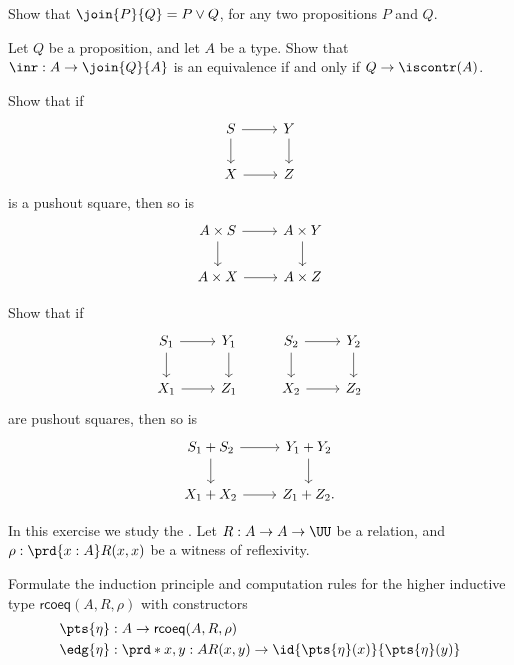\begin{exercises}
\item Show that $\join{P}{Q}= P\lor Q$, for any two propositions $P$ and $Q$.
\item Let $Q$ be a proposition, and let $A$ be a type. Show that $\inr:A\to \join{Q}{A}$ is an equivalence if and only if $Q\to\iscontr(A)$.
\item Show that if
\begin{equation*}
\begin{tikzcd}
S \arrow[r] \arrow[d] & Y \arrow[d] \\
X \arrow[r] & Z
\end{tikzcd}
\end{equation*}
is a pushout square, then so is
\begin{equation*}
\begin{tikzcd}
A\times S \arrow[r] \arrow[d] & A\times Y \arrow[d] \\
A\times X \arrow[r] & A\times Z
\end{tikzcd}
\end{equation*}
\item Show that if
\begin{equation*}
\begin{tikzcd}
S_1 \arrow[r] \arrow[d] & Y_1 \arrow[d] & S_2 \arrow[r] \arrow[d] & Y_2 \arrow[d] \\
X_1 \arrow[r] & Z_1 & X_2 \arrow[r] & Z_2
\end{tikzcd}
\end{equation*}
are pushout squares, then so is
\begin{equation*}
\begin{tikzcd}
S_1+S_2 \arrow[r] \arrow[d] & Y_1+ Y_2 \arrow[d] \\
X_1 +X_2 \arrow[r] & Z_1+Z_2. 
\end{tikzcd}
\end{equation*}
\item In this exercise we study the . Let $R:A\to A\to\UU$ be a relation, and $\rho:\prd{x:A}R(x,x)$ be a witness of reflexivity.  
\begin{subexenum}
\item Formulate the induction principle and computation rules for the higher inductive type $\mathsf{rcoeq}(A,R,\rho)$ with constructors
\begin{align*}
\pts{\eta} &: A \to \mathsf{rcoeq}(A,R,\rho) \\
\edg{\eta} &: \prd*{x,y:A} R(x,y)\to \id{\pts{\eta}(x)}{\pts{\eta}(y)} \\

\end{align*}
\end{subexenum}
\end{exercises}
